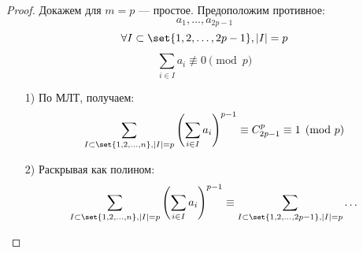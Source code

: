 \begin{proof}
Докажем для $m = p$ --- простое. Предоположим противное:
\[
a_1, \ldots, a_{2p - 1}
\]
\[
\forall I \subset \set{1, 2, \ldots, 2p - 1}, \left|I\right| = p
\]
\[
\sum_{i \in I}^{} a_i \not\equiv 0 \pmod p 
\]
\begin{itemize}
  \item [1) ] По МЛТ, получаем:
    \[
    \sum_{I \subset \set{1, 2, \ldots, n}, \left|I\right| = p}^{} \left(\sum_{i \in I}^{} a_i\right)^{p - 1} \equiv C_{2p - 1}^{p} \equiv 1 \pmod p
    \]
  \item [2) ] Раскрывая как полином:
    \[
    \sum_{I \subset \set{1, 2, \ldots, n}, \left|I\right| = p}^{} \left(\sum_{i \in I}^{} a_i\right)^{p - 1} \equiv \sum_{I \subset \set{1, 2, \ldots, 2p - 1}, \left|I\right| = p}^{} \ldots
    \]
\end{itemize}
\end{proof}
